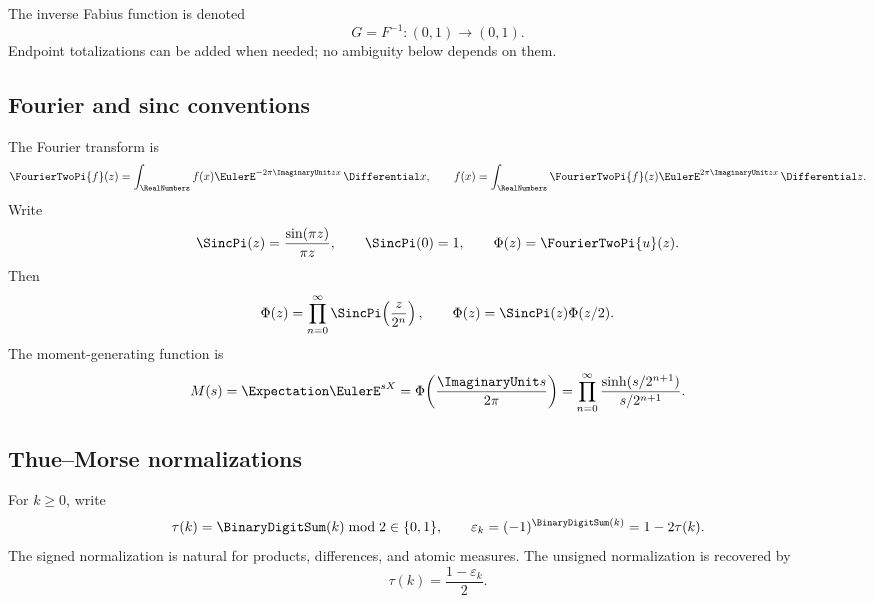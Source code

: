 \documentclass[11pt]{article}
\theoremstyle{definition}
\theoremstyle{remark}
\newcommand{\eps}{\varepsilon}
\begin{document}
The inverse Fabius function is denoted
\begin{equation}
 G=F^{-1}:(0,1)\longrightarrow(0,1).                       \label{p5:eq:G-def}
\end{equation}
Endpoint totalizations can be added when needed; no ambiguity below depends on
them.

\subsection{Fourier and sinc conventions}

The Fourier transform is
\begin{equation}
 \FourierTwoPi{f}(z)=\int_{\RealNumbers}f(x)\EulerE^{-2\pi\ImaginaryUnit zx}\,\Differential x,
 \qquad
 f(x)=\int_{\RealNumbers}\FourierTwoPi{f}(z)\EulerE^{2\pi\ImaginaryUnit zx}\,\Differential z.       \label{p5:eq:Fourier-convention}
\end{equation}
Write
\begin{equation}
 \SincPi(z)=\frac{\sin(\pi z)}{\pi z},\qquad \SincPi(0)=1,
 \qquad \Phi(z)=\FourierTwoPi{u}(z).                             \label{p5:eq:sinc-Phi}
\end{equation}
Then
\begin{equation}
 \Phi(z)=\prod_{n=0}^{\infty}\SincPi\!\left(\frac z{2^n}\right),
 \qquad
 \Phi(z)=\SincPi(z)\Phi(z/2).                              \label{p5:eq:Phi-product-scale}
\end{equation}
The moment-generating function is
\begin{equation}
 M(s)=\Expectation\EulerE^{sX}=\Phi\!\left(\frac{\ImaginaryUnit s}{2\pi}\right)
 =\prod_{n=0}^{\infty}
   \frac{\sinh(s/2^{n+1})}{s/2^{n+1}}.                    \label{p5:eq:M-product}
\end{equation}

\subsection{Thue--Morse normalizations}

For $k\ge0$, write
\begin{equation}
 \tau(k)=\BinaryDigitSum(k)\bmod2\in\{0,1\},
 \qquad
 \eps_k=(-1)^{\BinaryDigitSum(k)}=1-2\tau(k).                          \label{p5:eq:TM-normalizations}
\end{equation}
The signed normalization is natural for products, differences, and atomic
measures.  The unsigned normalization is recovered by
\begin{equation}
 \tau(k)=\frac{1-\eps_k}{2}.                               \label{p5:eq:TM-bridge}
\end{equation}
\end{document}
